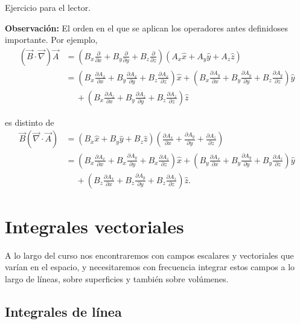 \begin{demo}
Ejercicio para el lector.
\end{demo}

\textbf{Observación:} El orden en el que se aplican los operadores antes definidoses importante. Por ejemplo,
\begin{align}
    (\Vec{B} \cdot \Vec{\nabla}) \Vec{A} &= \left( B_x \frac{\partial}{\partial x} + B_y \frac{\partial}{\partial y} + B_z \frac{\partial}{\partial z}\right) \left( A_x \hat{x} + A_y \hat{y} + A_z \hat{z}\right) \\
    &= \left(B_x \frac{\partial A_x}{\partial x} + B_y \frac{\partial A_x}{\partial y}  + B_z\frac{\partial A_x}{\partial z} \right) \hat{x} + \left(B_x \frac{\partial A_y}{\partial x} + B_y \frac{\partial A_y}{\partial y}  + B_z\frac{\partial A_y}{\partial z} \right) \hat{y} \nonumber \\
    &\ \quad + \left(B_x \frac{\partial A_z}{\partial x} + B_y \frac{\partial A_z}{\partial y}  + B_z\frac{\partial A_z}{\partial z} \right) \hat{z}
\end{align}

es distinto de
\begin{align}
    \Vec{B} ( \Vec{\nabla} \cdot \Vec{A}) &= \left( B_x \hat{x} + B_y \hat{y} + B_z \hat{z}\right) \left( \frac{\partial A_x}{\partial x} + \frac{\partial A_y}{\partial y} + \frac{\partial A_z}{\partial z}\right)  \\
    &= \left(B_x \frac{\partial A_x}{\partial x} + B_x \frac{\partial A_y}{\partial y}  + B_x\frac{\partial A_z}{\partial z} \right) \hat{x} + \left(B_y \frac{\partial A_x}{\partial x} + B_y \frac{\partial A_y}{\partial y}  + B_y \frac{\partial A_z}{\partial z} \right) \hat{y} \nonumber \\
    &\ \quad + \left(B_z \frac{\partial A_x}{\partial x} + B_z \frac{\partial A_y}{\partial y}  + B_z\frac{\partial A_z}{\partial z} \right) \hat{z}.
\end{align}

\section{Integrales vectoriales}

A lo largo del curso nos encontraremos con campos escalares y vectoriales que varían en el espacio, y necesitaremos con frecuencia integrar estos campos a lo largo de líneas, sobre superficies y también sobre volúmenes.

\subsection{Integrales de línea}

